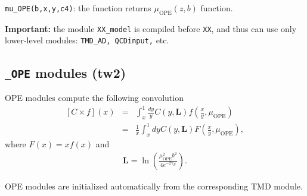 \documentclass[prd,nofootinbib,eqsecnum,final]{revtex4}
\renewcommand{\(}{\left(}
\renewcommand{\)}{\right)}
\renewcommand{\[}{\left[}
\renewcommand{\]}{\right]}
\begin{document}
\texttt{mu\_OPE(b,x,y,c4)}: the function returns $\mu_\text{OPE}(z,b)$ function.

\textbf{Important:} the module \texttt{XX\_model} is compiled before \texttt{XX}, and thus can use only lower-level modules: \texttt{TMD\_AD, QCDinput,} etc.

\subsection{\texttt{\_OPE} modules (tw2)}
\label{TMD_OPE}

OPE modules compute the following convolution
\begin{eqnarray}\label{OPE:tw2:main}
[C\times f](x)&=&\int_x^1 \frac{dy}{y} C(y,\mathbf{L})f\(\frac{x}{y},\mu_{\text{OPE}}\)
\\
&=&
\frac{1}{x}\int_x^1 dy C(y,\mathbf{L})F\(\frac{x}{y},\mu_{\text{OPE}}\),
\end{eqnarray}
where $F(x)=xf(x)$ and 
\begin{eqnarray}
\mathbf{L}=\ln\(\frac{\mu^2_{\text{OPE}}b^2}{4e^{-2\gamma_E}}\).
\end{eqnarray}

\begin{tcolorbox}
\begin{center}
OPE modules are initialized automatically from the corresponding TMD module. 
\end{center}
\end{tcolorbox}
\end{document}
